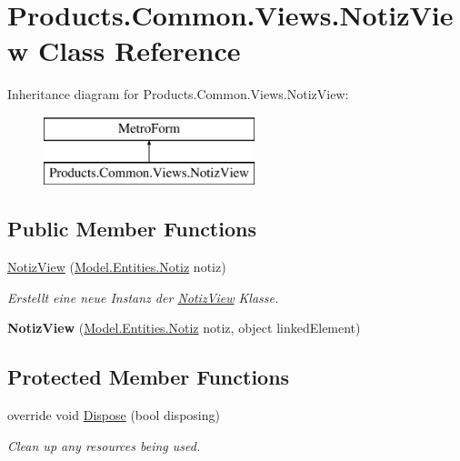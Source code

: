 \hypertarget{class_products_1_1_common_1_1_views_1_1_notiz_view}{}\section{Products.\+Common.\+Views.\+Notiz\+View Class Reference}
\label{class_products_1_1_common_1_1_views_1_1_notiz_view}
Inheritance diagram for Products.\+Common.\+Views.\+Notiz\+View\+:\begin{figure}[H]
\begin{center}
\leavevmode
\includegraphics[height=2.000000cm]{class_products_1_1_common_1_1_views_1_1_notiz_view}
\end{center}
\end{figure}
\subsection*{Public Member Functions}
\begin{DoxyCompactItemize}
\item 
\hyperlink{class_products_1_1_common_1_1_views_1_1_notiz_view_acde461b2fc084569dc979d78bc322aa2}{Notiz\+View} (\hyperlink{class_products_1_1_model_1_1_entities_1_1_notiz}{Model.\+Entities.\+Notiz} notiz)
\begin{DoxyCompactList}\small\item\em Erstellt eine neue Instanz der \hyperlink{class_products_1_1_common_1_1_views_1_1_notiz_view}{Notiz\+View} Klasse. \end{DoxyCompactList}\item 
{\bfseries Notiz\+View} (\hyperlink{class_products_1_1_model_1_1_entities_1_1_notiz}{Model.\+Entities.\+Notiz} notiz, object linked\+Element)\hypertarget{class_products_1_1_common_1_1_views_1_1_notiz_view_aa1249b22d66c8ea341ac30e8d6dbd049}{}\label{class_products_1_1_common_1_1_views_1_1_notiz_view_aa1249b22d66c8ea341ac30e8d6dbd049}

\end{DoxyCompactItemize}
\subsection*{Protected Member Functions}
\begin{DoxyCompactItemize}
\item 
override void \hyperlink{class_products_1_1_common_1_1_views_1_1_notiz_view_aca06afb453e5dc10a1a12644ef564e74}{Dispose} (bool disposing)
\begin{DoxyCompactList}\small\item\em Clean up any resources being used. \end{DoxyCompactList}\end{DoxyCompactItemize}


